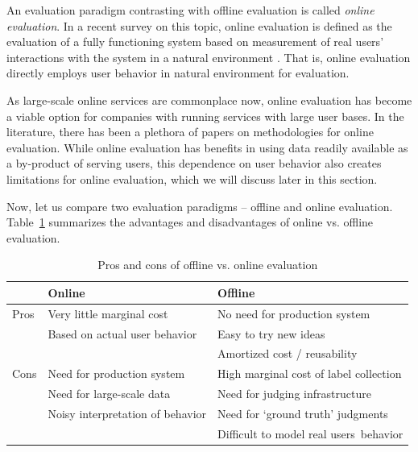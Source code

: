 An evaluation paradigm contrasting with offline evaluation is called \textit{online evaluation}. In a recent survey on this topic, online evaluation is defined as the evaluation of a fully functioning system based on measurement of real users' interactions with the system in a natural environment \citep{INR-XYZ}. That is, online evaluation directly employs user behavior in natural environment for evaluation.

As large-scale online services are commonplace now, online evaluation has become a viable option for companies with running services with large user bases. In the literature, there has been a plethora of papers on methodologies for online evaluation. While online evaluation has benefits in using data readily available as a by-product of serving users, this dependence on user behavior also creates limitations for online evaluation, which we will discuss later in this section.


Now, let us compare two evaluation paradigms -- offline and online evaluation. 
Table~\ref{onlinevsoffline} summarizes the advantages and disadvantages of online vs. offline evaluation. %

\begin{table}
	\centering
	\footnotesize
	\caption{Pros and cons of offline vs. online evaluation}
	\begin{tabular}{|l|l|l|} \hline
 & Online & Offline \\ \hline
 Pros & Very little marginal cost & No need for production system \\
 & Based on actual user behavior & Easy to try new ideas \\
 &  & Amortized cost / reusability \\ \hline
 Cons & Need for production system & High marginal cost of label collection \\
 & Need for large-scale data & Need for judging infrastructure \\
 & Noisy interpretation of behavior & Need for `ground truth' judgments \\
 & & Difficult to model real users\ behavior \\
	\hline\end{tabular}
	\label{onlinevsoffline}
\end{table}

